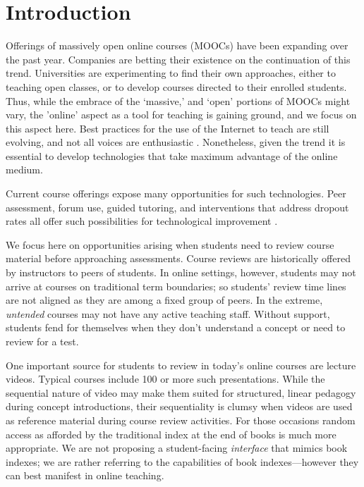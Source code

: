 \section{Introduction}
\label{sec:intro}

Offerings of massively open online courses (MOOCs) have been expanding
over the past year. Companies are betting their existence on the
continuation of this trend. Universities are experimenting to find
their own approaches, either to teaching open classes, or to develop
courses directed to their enrolled students. Thus, while the embrace
of the `massive,' and `open' portions of MOOCs might vary, the
'online' aspect as a tool for teaching is gaining ground, and we focus
on this aspect here. Best practices for the use of the Internet to
teach are still evolving, and not all voices are enthusiastic
\cite{Eckerdal2014}. Nonetheless, given the trend it is essential to
develop technologies that take maximum advantage of the online medium.

Current course offerings expose many opportunities for such
technologies. Peer assessment, forum use, guided tutoring, and
interventions that address dropout rates all offer such possibilities
for technological improvement \cite{Piech2013,
  balfour2013,Coetzee2014, agrawal2015, halawa2014dropout,
  yang2013turn}.

We focus here on opportunities arising when students need to review
course material before approaching assessments. Course reviews are
historically offered by instructors to peers of students. In online
settings, however, students may not arrive at courses on traditional
term boundaries; so students' review time lines are not aligned as
they are among a fixed group of peers. In the extreme,
\textit{untended} courses may not have any active teaching
staff. Without support, students fend for themselves when they don't
understand a concept or need to review for a test.

One important source for students to review in today's online courses
are lecture videos. Typical courses include 100 or more such
presentations. While the sequential nature of video may make them
suited for structured, linear pedagogy during concept introductions,
their sequentiality is clumsy when videos are used as reference
material during course review activities. For those occasions random
access as afforded by the traditional index at the end of books is
much more appropriate. We are not proposing a student-facing {\em
  interface} that mimics book indexes; we are rather referring to the
capabilities of book indexes---however they can best manifest in
online teaching.

